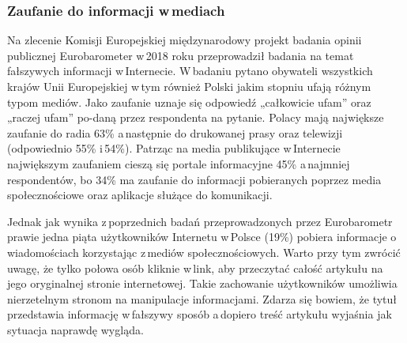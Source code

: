 \subsubsection{Zaufanie do informacji w\,mediach}
Na zlecenie Komisji Europejskiej międzynarodowy projekt badania opinii publicznej Eurobarometer w\,2018 roku przeprowadził badania na temat fałszywych informacji w\,Internecie\cite{Eurobarometer4642018}. W\,badaniu pytano obywateli wszystkich krajów Unii Europejskiej w\,tym również Polski jakim stopniu ufają różnym typom mediów. Jako zaufanie uznaje się odpowiedź „całkowicie ufam” oraz „raczej ufam” po-daną przez respondenta na pytanie. Polacy mają największe zaufanie do radia 63\% a\,następnie do drukowanej prasy oraz telewizji (odpowiednio 55\% i\,54\%). Patrząc na media publikujące w\,Internecie największym zaufaniem cieszą się portale informacyjne 45\% a\,najmniej respondentów, bo 34\% ma zaufanie do informacji pobieranych poprzez media społecznościowe oraz aplikacje służące do komunikacji. 
\par
Jednak jak wynika z\,poprzednich badań przeprowadzonych przez Eurobarometr prawie jedna piąta użytkowników Internetu w\,Polsce (19\%) pobiera informacje o wiadomościach korzystając z\,mediów społecznościowych. Warto przy tym zwrócić uwagę, że tylko połowa osób kliknie w\,link, aby przeczytać całość artykułu na jego oryginalnej stronie internetowej\cite{Eurobarometer2016}. Takie zachowanie użytkowników umożliwia nierzetelnym stronom na manipulacje informacjami. Zdarza się bowiem, że tytuł przedstawia informację w\,fałszywy sposób a\,dopiero treść artykułu wyjaśnia jak sytuacja naprawdę wygląda. 
